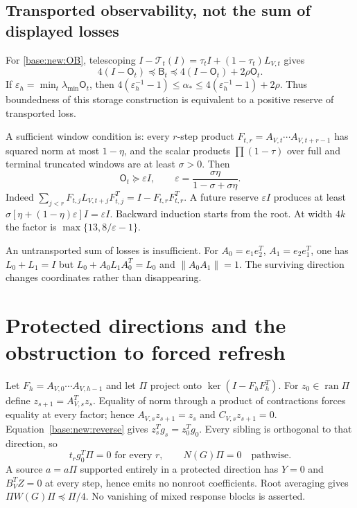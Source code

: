 \documentclass[11pt,oneside,openany,a4paper]{book}
\numberwithin{equation}{chapter}
\theoremstyle{definition}
\theoremstyle{remark}
\begin{document}
\subsection{Transported observability, not the sum of displayed losses}
For \eqref{base:new:OB}, telescoping $I-\mathcal T_t(I)=\tau_tI+(1-\tau_t)L_{V,t}$ gives
\begin{equation}\label{base:new:OBsandwich}
 4(I-\mathsf O_t)\preceq\mathsf B_t
 \preceq4(I-\mathsf O_t)+2\rho\mathsf O_t.
\end{equation}
If $\varepsilon_h=\min_t\lambda_{\min}\mathsf O_t$, then
$4(\varepsilon_h^{-1}-1)\le\alpha_*\le4(\varepsilon_h^{-1}-1)+2\rho$.
Thus boundedness of this storage construction is equivalent to a positive reserve of transported loss.

A sufficient window condition is: every $r$-step product
$F_{t,r}=A_{V,t}\cdots A_{V,t+r-1}$ has squared norm at most $1-\eta$, and the scalar products $\prod(1-\tau)$ over full and terminal truncated windows are at least $\sigma>0$. Then
\[
 \mathsf O_t\succeq\varepsilon I,\qquad
 \varepsilon=\frac{\sigma\eta}{1-\sigma+\sigma\eta}.
\]
Indeed $\sum_{j<r}F_{t,j}L_{V,t+j}F_{t,j}^T=I-F_{t,r}F_{t,r}^T$. A future reserve $\varepsilon I$ produces at least $\sigma[\eta+(1-\eta)\varepsilon]I=\varepsilon I$. Backward induction starts from the root. At width $4k$ the factor is $\max\{13,8/\varepsilon-1\}$.

An untransported sum of losses is insufficient. For $A_0=e_1e_2^T$, $A_1=e_2e_1^T$, one has $L_0+L_1=I$ but $L_0+A_0L_1A_0^T=L_0$ and $\|A_0A_1\|=1$. The surviving direction changes coordinates rather than disappearing.

\section{Protected directions and the obstruction to forced refresh}\label{base:new:protected}
Let $F_h=A_{V,0}\cdots A_{V,h-1}$ and let $\Pi$ project onto $\ker(I-F_hF_h^T)$. For $z_0\in\operatorname{ran}\Pi$ define $z_{s+1}=A_{V,s}^Tz_s$. Equality of norm through a product of contractions forces equality at every factor; hence $A_{V,s}z_{s+1}=z_s$ and $C_{V,s}z_{s+1}=0$. Equation~\eqref{base:new:reverse} gives $z_s^Tg_s=z_0^Tg_0$. Every sibling is orthogonal to that direction, so
\begin{equation}\label{base:new:protected-source}
 t_rg_0^T\Pi=0\text{ for every }r,\qquad N(G)\Pi=0\quad\text{pathwise}.
\end{equation}
A source $a=a\Pi$ supported entirely in a protected direction has $Y=0$ and $B_V^TZ=0$ at every step, hence emits no nonroot coefficients. Root averaging gives
$\Pi W(G)\Pi\preceq\Pi/4$. No vanishing of mixed response blocks is asserted.
\end{document}
